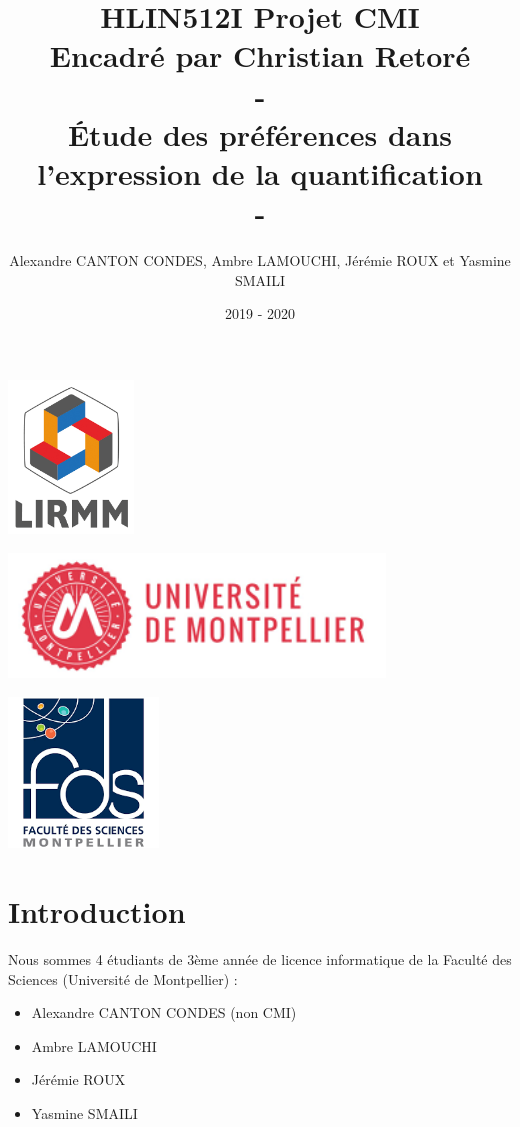 \documentclass[11pt,letterpaper]{article}
\author{Alexandre CANTON CONDES, Ambre LAMOUCHI, Jérémie ROUX et Yasmine SMAILI}
\title{HLIN512I Projet CMI \\ Encadré par Christian Retoré\\ - \\ \textbf{Étude des préférences dans l’expression de la quantification} \\ - \\ }
\date{2019 - 2020}
\begin{document}
\maketitle

\vspace{8px}

\begin{center}
\includegraphics[width=0.25\textwidth]{figures/lirmm}
\end{center}

\vspace{10px}

\begin{center}
\includegraphics[width = 100mm]{figures/umontpellier}
\end{center}

\vspace{10px}

\begin{center}
\includegraphics[width = 40mm]{figures/facSciences}
\end{center}

\newpage
{\small\tableofcontents}

\newpage

\part{Introduction}
Nous sommes 4 étudiants de 3ème année de licence informatique de la Faculté des Sciences (Université de Montpellier) :
\begin{itemize}
    \item Alexandre CANTON CONDES (non CMI)
    \item Ambre LAMOUCHI
    \item Jérémie ROUX
    \item Yasmine SMAILI
\end{itemize}
\end{document}
